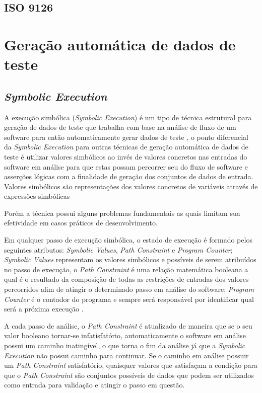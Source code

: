 \documentclass[
	12pt,				%
	oneside,			%
	a4paper,			%
	english,			%
	brazil				%
	]{abntex2ppgsi}
\begin{document}
\section{ISO 9126}



\chapter{Geração automática de dados de teste}

\section{\textit{Symbolic Execution}}
A execução simbólica (\textit{Symbolic Execution}) é um tipo de técnica estrutural para geração de dados de teste que trabalha com base na análise de fluxo de um software para então automaticamente gerar dados de teste \cite{Anand2013}, o ponto diferencial da \textit{Symbolic Execution} para outras técnicas de geração automática de dados de teste é utilizar valores simbólicos ao invés de valores concretos \cite{King1976} nas entradas do software em análise para que estas possam percorrer seu do fluxo de software e asserções lógicas com a finalidade de geração dos conjuntos de dados de entrada.
Valores simbólicos são representações dos valores concretos de variáveis através de expressões simbólicas \cite{Anand2013}
	 

Porém a técnica possui alguns problemas fundamentais as quais limitam sua efetividade em casos práticos de desenvolvimento.

Em qualquer passo de execução simbólica, o estado de execução é formado pelos seguintes atributos: \textit{Symbolic Values}, \textit{Path Constraint} e  \textit{Program Counter}; \textit{Symbolic Values} representam os valores simbólicos e possíveis de serem atribuídos no passo de execução, o \textit{Path Constraint} é uma relação matemática booleana a qual é o resultado da composição de todas as restrições de entradas dos valores percorridos afim de atingir o determinado passo em análise do software;  \textit{Program Counter} é o contador do programa e sempre será responsável por identificar qual será a próxima execução .

A cada passo de análise, o \textit{Path Constraint} é atualizado de maneira que se o seu valor booleano tornar-se infatisfatório, automaticamente o software em análise possui um caminho inatingível, o que torna o fim da análise já que a \textit{Symbolic Execution} não possui caminho para continuar.
Se o caminho em análise possuir um \textit{Path Constraint} satisfatório, quaisquer valores que satisfaçam a condição para que o \textit{Path Constraint} são conjuntos possíveis de dados que podem ser utilizados como entrada para validação e atingir o passo em questão.
\end{document}
